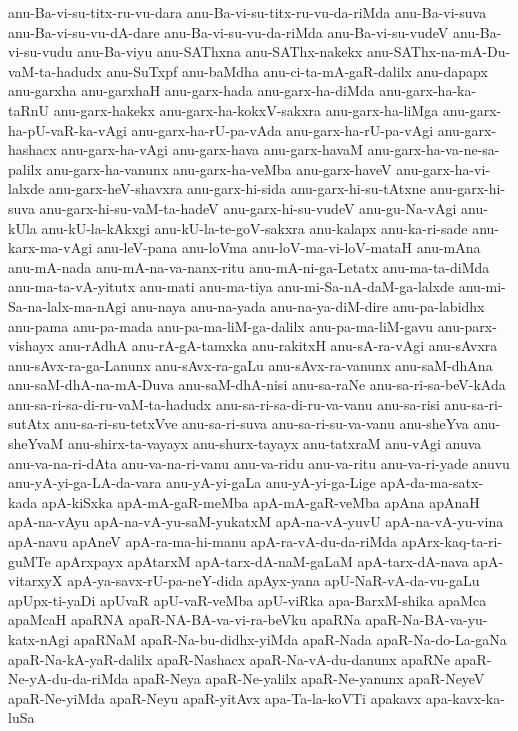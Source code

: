 {anu-Ba-vi-su-titx-ru-vu-dara
anu-Ba-vi-su-titx-ru-vu-da-riMda
anu-Ba-vi-suva
anu-Ba-vi-su-vu-dA-dare
anu-Ba-vi-su-vu-da-riMda
anu-Ba-vi-su-vudeV
anu-Ba-vi-su-vudu
anu-Ba-viyu
anu-SAThxna
anu-SAThx-nakekx
anu-SAThx-na-mA-Du-vaM-ta-hadudx
anu-SuTxpf
anu-baMdha
anu-ci-ta-mA-gaR-dalilx
anu-dapapx
anu-garxha
anu-garxhaH
anu-garx-hada
anu-garx-ha-diMda
anu-garx-ha-ka-taRnU
anu-garx-hakekx
anu-garx-ha-kokxV-sakxra
anu-garx-ha-liMga
anu-garx-ha-pU-vaR-ka-vAgi
anu-garx-ha-rU-pa-vAda
anu-garx-ha-rU-pa-vAgi
anu-garx-hashacx
anu-garx-ha-vAgi
anu-garx-hava
anu-garx-havaM
anu-garx-ha-va-ne-sa-palilx
anu-garx-ha-vanunx
anu-garx-ha-veMba
anu-garx-haveV
anu-garx-ha-vi-lalxde
anu-garx-heV-shavxra
anu-garx-hi-sida
anu-garx-hi-su-tAtxne
anu-garx-hi-suva
anu-garx-hi-su-vaM-ta-hadeV
anu-garx-hi-su-vudeV
anu-gu-Na-vAgi
anu-kUla
anu-kU-la-kAkxgi
anu-kU-la-te-goV-sakxra
anu-kalapx
anu-ka-ri-sade
anu-karx-ma-vAgi
anu-leV-pana
anu-loVma
anu-loV-ma-vi-loV-mataH
anu-mAna
anu-mA-nada
anu-mA-na-va-nanx-ritu
anu-mA-ni-ga-Letatx
anu-ma-ta-diMda
anu-ma-ta-vA-yitutx
anu-mati
anu-ma-tiya
anu-mi-Sa-nA-daM-ga-lalxde
anu-mi-Sa-na-lalx-ma-nAgi
anu-naya
anu-na-yada
anu-na-ya-diM-dire
anu-pa-labidhx
anu-pama
anu-pa-mada
anu-pa-ma-liM-ga-dalilx
anu-pa-ma-liM-gavu
anu-parx-vishayx
anu-rAdhA
anu-rA-gA-tamxka
anu-rakitxH
anu-sA-ra-vAgi
anu-sAvxra
anu-sAvx-ra-ga-Lanunx
anu-sAvx-ra-gaLu
anu-sAvx-ra-vanunx
anu-saM-dhAna
anu-saM-dhA-na-mA-Duva
anu-saM-dhA-nisi
anu-sa-raNe
anu-sa-ri-sa-beV-kAda
anu-sa-ri-sa-di-ru-vaM-ta-hadudx
anu-sa-ri-sa-di-ru-va-vanu
anu-sa-risi
anu-sa-ri-sutAtx
anu-sa-ri-su-tetxVve
anu-sa-ri-suva
anu-sa-ri-su-va-vanu
anu-sheYva
anu-sheYvaM
anu-shirx-ta-vayayx
anu-shurx-tayayx
anu-tatxraM
anu-vAgi
anuva
anu-va-na-ri-dAta
anu-va-na-ri-vanu
anu-va-ridu
anu-va-ritu
anu-va-ri-yade
anuvu
anu-yA-yi-ga-LA-da-vara
anu-yA-yi-gaLa
anu-yA-yi-ga-Lige
apA-da-ma-satx-kada
apA-kiSxka
apA-mA-gaR-meMba
apA-mA-gaR-veMba
apAna
apAnaH
apA-na-vAyu
apA-na-vA-yu-saM-yukatxM
apA-na-vA-yuvU
apA-na-vA-yu-vina
apA-navu
apAneV
apA-ra-ma-hi-manu
apA-ra-vA-du-da-riMda
apArx-kaq-ta-ri-guMTe
apArxpayx
apAtarxM
apA-tarx-dA-naM-gaLaM
apA-tarx-dA-nava
apA-vitarxyX
apA-ya-savx-rU-pa-neY-dida
apAyx-yana
apU-NaR-vA-da-vu-gaLu
apUpx-ti-yaDi
apUvaR
apU-vaR-veMba
apU-viRka
apa-BarxM-shika
apaMca
apaMcaH
apaRNA
apaR-NA-BA-va-vi-ra-beVku
apaRNa
apaR-Na-BA-va-yu-katx-nAgi
apaRNaM
apaR-Na-bu-didhx-yiMda
apaR-Nada
apaR-Na-do-La-gaNa
apaR-Na-kA-yaR-dalilx
apaR-Nashacx
apaR-Na-vA-du-danunx
apaRNe
apaR-Ne-yA-du-da-riMda
apaR-Neya
apaR-Ne-yalilx
apaR-Ne-yanunx
apaR-NeyeV
apaR-Ne-yiMda
apaR-Neyu
apaR-yitAvx
apa-Ta-la-koVTi
apakavx
apa-kavx-ka-luSa
}

